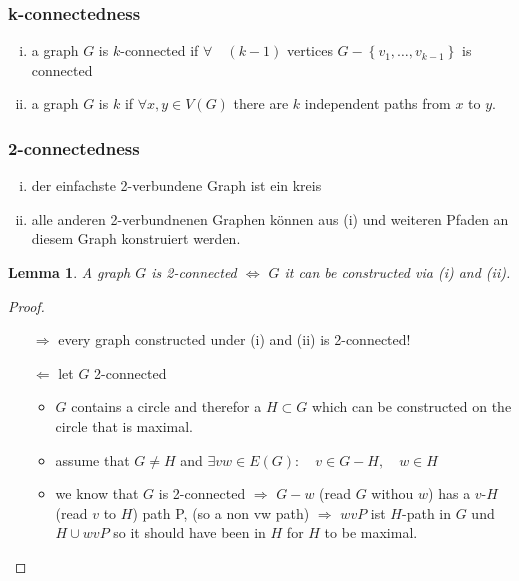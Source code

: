 \documentclass[a4paper]{article}
\newtheorem{lemma}[theorem]{Lemma}
\theoremstyle{definition}
\theoremstyle{remark}
\begin{document}
\subsubsection{k-connectedness}
\label{ssub:k_connectedness}

	\begin{enumerate}[(i)]
		\item a graph   $G$ is $k$-connected if $\forall \quad (k-1)$ vertices $G-\left\{ v_1,\dots,v_{k-1} \right\}$ is connected
		\item a graph $G$ is $k$ if $\forall x,y \in V(G)$ there are  $k$ independent paths from $x$ to $y$.
	\end{enumerate}
\subsubsection{2-connectedness}
\label{ssub:2_connectedness}
\begin{enumerate}[(i)]
  \item der einfachste 2-verbundene Graph ist ein kreis
  \item alle anderen 2-verbundnenen Graphen können aus (i) und weiteren Pfaden an diesem Graph konstruiert werden.
\end{enumerate}
\begin{lemma}
	A graph  $G$ is 2-connected  $\Leftrightarrow$ $G$ it can be constructed via (i) and (ii).
\end{lemma}
\begin{proof}
	$ $\\
  \begin{itemize}
		\item[$\Rightarrow$] every graph constructed under (i) and (ii) is 2-connected!
		\item[$\Leftarrow$] let $G$ 2-connected
      \begin{itemize}
				\item $G$ contains a circle and therefor a $H\subset G$ which can be constructed on the circle that is maximal. 
				\item assume that $G\neq H$ and $\exists  vw \in E(G):\quad v \in G-H,\quad w \in H$
				\item we know that $G$ is 2-connected $\Rightarrow$ $G-w$ (read $G$ withou $w$) has a  $v$-$H$(read $v$ to $H$) path P, (so a non vw path) $\Rightarrow$ $wvP$ ist $H$-path in $G$ und $H \cup wvP$ so it should have been in $H$ for $H$ to be maximal. 
      \end{itemize}
	\end{itemize}
\end{proof}
\end{document}

